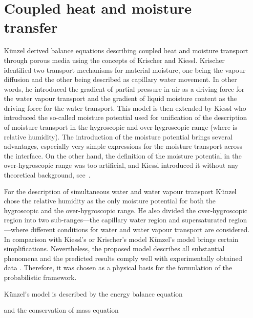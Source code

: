 \documentclass[preprint,12pt]{elsarticle}
\begin{document}
\section{Coupled heat and moisture transfer}
\label{sec:kunzel}
K\"{u}nzel \cite{Kunzel:1995, Kunzel:1997} derived balance equations
describing coupled heat and moisture transport through porous media
using the concepts of Krischer and Kiessl. Krischer
\cite{Krischer:1978} identified two transport mechanisms for material
moisture, one being the vapour diffusion and the other being described
as capillary water movement. In other words, he introduced the
gradient of partial pressure in air as a driving force for the water
vapour transport and the gradient of liquid moisture content as the
driving force for the water transport. This model is then extended by
Kiessl \cite{Kiessl:1983} who introduced the so-called moisture
potential  used for unification of the description of moisture
transport in the hygroscopic  and over-hygroscopic
 range (where  is relative humidity). The
introduction of the moisture potential brings several advantages,
especially very simple expressions for the moisture transport across
the interface. On the other hand, the definition of the moisture
potential in the over-hygroscopic range was too artificial, and Kiessl
introduced it without any theoretical background,
see~\cite{Cerny:2002}.

For the description of simultaneous water and water vapour
transport K\"{u}nzel chose the relative humidity  as the
only moisture potential for both the hygroscopic and the over-hygroscopic
range. He also divided the over-hygroscopic region into two
sub-ranges---the capillary water region and supersaturated
region---where different
conditions for water and water vapour transport are considered. In
comparison with Kiessl's or Krischer's model K\"{u}nzel's model
brings certain simplifications. Nevertheless, the proposed model
describes all substantial phenomena and the predicted results
comply well with experimentally obtained data
\cite{Sykora:2011:AMC}. Therefore, it was chosen as a physical basis
for the formulation of the probabilistic framework.

K\"unzel's model is described by the energy balance equation

and the conservation of mass equation
\end{document}
